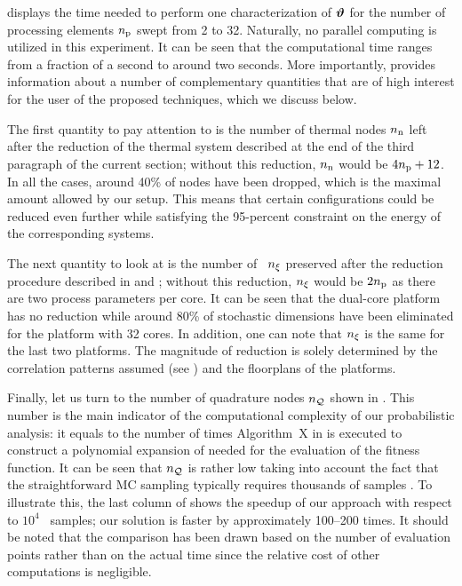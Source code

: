 
 displays the time needed to perform one characterization of $\bm{\vartheta}$ for the number of processing elements ${n_\text{p}}$ swept from 2 to 32.
Naturally, no parallel computing is utilized in this experiment.
It can be seen that the computational time ranges from a fraction of a second to around two seconds.
More importantly,  provides information about a number of complementary quantities that are of high interest for the user of the proposed techniques, which we discuss below.

The first quantity to pay attention to is the number of thermal nodes ${n_\text{n}}$ left after the reduction of the thermal system described at the end of the third paragraph of the current section; without this reduction, ${n_\text{n}}$ would be $4 {n_\text{p}} + 12$.
In all the cases, around 40\% of nodes have been dropped, which is the maximal amount allowed by our setup.
This means that certain configurations could be reduced even further while satisfying the 95-percent constraint on the energy of the corresponding systems.

The next quantity to look at is the number of \rvs\ ${n_\xi}$ preserved after the reduction procedure described in  and ; without this reduction, ${n_\xi}$ would be $2 {n_\text{p}}$ as there are two process parameters per core.
It can be seen that the dual-core platform has no reduction while around 80\% of stochastic dimensions have been eliminated for the platform with 32 cores.
In addition, one can note that ${n_\xi}$ is the same for the last two platforms.
The magnitude of reduction is solely determined by the correlation patterns assumed (see ) and the floorplans of the platforms.

Finally, let us turn to the number of quadrature nodes ${n_\mathcal{Q}}$ shown in .
This number is the main indicator of the computational complexity of our probabilistic analysis: it equals to the number of times Algorithm~X in  is executed to construct a polynomial expansion of  needed for the evaluation of the fitness function.
It can be seen that ${n_\mathcal{Q}}$ is rather low taking into account the fact that the straightforward MC sampling typically requires thousands of samples \cite{ukhov2014, lee2013, xiang2010, juan2012}.
To illustrate this, the last column of  shows the speedup of our approach with respect to $10^4$ \MC\ samples; our solution is faster by approximately 100--200 times.
It should be noted that the comparison has been drawn based on the number of evaluation points rather than on the actual time since the relative cost of other computations is negligible.
